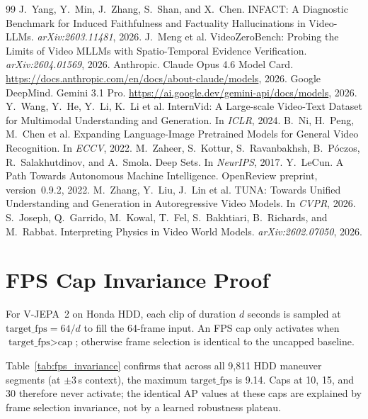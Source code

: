 \documentclass{article}
\theoremstyle{remark}
\begin{document}
\begin{thebibliography}{99}
 J.~Yang, Y.~Min, J.~Zhang, S.~Shan, and X.~Chen. INFACT: A Diagnostic Benchmark for Induced Faithfulness and Factuality Hallucinations in Video-LLMs. \emph{arXiv:2603.11481}, 2026.
 J.~Meng et al. VideoZeroBench: Probing the Limits of Video MLLMs with Spatio-Temporal Evidence Verification. \emph{arXiv:2604.01569}, 2026.
 Anthropic. Claude Opus 4.6 Model Card. \url{https://docs.anthropic.com/en/docs/about-claude/models}, 2026.
 Google DeepMind. Gemini 3.1 Pro. \url{https://ai.google.dev/gemini-api/docs/models}, 2026.
 Y.~Wang, Y.~He, Y.~Li, K.~Li et al. InternVid: A Large-scale Video-Text Dataset for Multimodal Understanding and Generation. In \emph{ICLR}, 2024.
 B.~Ni, H.~Peng, M.~Chen et al. Expanding Language-Image Pretrained Models for General Video Recognition. In \emph{ECCV}, 2022.
 M.~Zaheer, S.~Kottur, S.~Ravanbakhsh, B.~P\'{o}czos, R.~Salakhutdinov, and A.~Smola. Deep Sets. In \emph{NeurIPS}, 2017.
 Y.~LeCun. A Path Towards Autonomous Machine Intelligence. OpenReview preprint, version~0.9.2, 2022.
 M.~Zhang, Y.~Liu, J.~Lin et al. TUNA: Towards Unified Understanding and Generation in Autoregressive Video Models. In \emph{CVPR}, 2026.
 S.~Joseph, Q.~Garrido, M.~Kowal, T.~Fel, S.~Bakhtiari, B.~Richards, and M.~Rabbat. Interpreting Physics in Video World Models. \emph{arXiv:2602.07050}, 2026.
\end{thebibliography}

\ifdefined\neuripssubmission
  \newpage
  
\fi

\appendix

\section{FPS Cap Invariance Proof}
\label{sec:fps_invariance}

For V-JEPA~2 on Honda HDD, each clip of duration $d$ seconds is sampled at $\text{target\_fps} = 64 / d$ to fill the 64-frame input. An FPS cap only activates when $\text{target\_fps} > \text{cap}$; otherwise frame selection is identical to the uncapped baseline.

Table~\ref{tab:fps_invariance} confirms that across all 9{,}811 HDD maneuver segments (at $\pm$3\,s context), the maximum $\text{target\_fps}$ is 9.14. Caps at 10, 15, and 30 therefore never activate; the identical AP values at these caps are explained by frame selection invariance, not by a learned robustness plateau.
\end{document}
